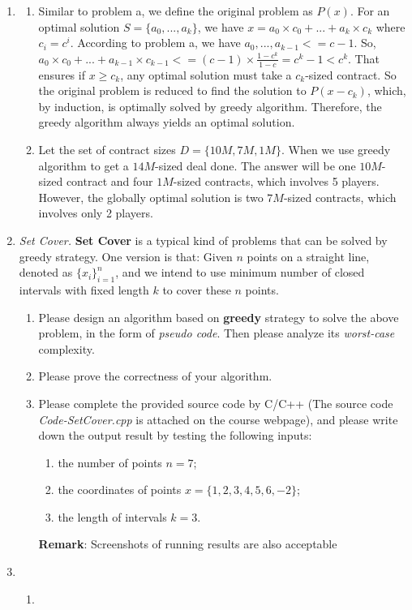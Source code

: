 \documentclass[12pt,a4paper]{article}
\makeatletter
\newtheorem*{solution}{Solution}
\theoremstyle{definition}
\renewenvironment{solution}[1][Solution] {\par\pushQED{\qed}\normalfont\topsep6\p@\@plus6\p@\relax\trivlist\item[\hskip\labelsep\bfseries#1\@addpunct{.}]\ignorespaces}{\popQED\endtrivlist\@endpefalse} \makeatother
\makeatother
\begin{document}
\begin{enumerate}
\begin{solution}
\begin{enumerate}
                \item Similar to problem a, we define the original problem as $P(x)$. 
                For an optimal solution $S=\{a_0,...,a_k\}$, we have $x = a_0\times c_0+...+a_k\times c_k$ where $ c_i = c^{i}$. 
                According to problem a, we have $a_0,...,a_{k-1}<=c-1$. 
                So, $a_0\times c_0+...+a_{k-1}\times c_{k-1}<=(c-1)\times \frac{1-c^{k}}{1-c}=c^{k}-1<c^{k}$.
                That ensures if $x\ge c_k$, any optimal solution must take a $c_k$-sized contract.
                So the original problem is reduced to find the solution to $P(x-c_k)$, which, by induction, is optimally solved by greedy algorithm.
                Therefore, the greedy algorithm always yields an optimal solution.
                
                \item Let the set of contract sizes $D = \{10M,7M,1M\}$. 
                When we use greedy algorithm to get a $14M$-sized deal done.
                The answer will be one $10M$-sized contract and four $1M$-sized contracts, which involves 5 players.
                However, the globally optimal solution is two $7M$-sized contracts, which involves only 2 players.
        \end{enumerate}
    \end{solution}
    
	
    \item \textit{Set Cover.} \textbf{Set Cover} is a typical kind of problems that can be solved by greedy strategy. One version is that: Given $n$ points on a straight line, denoted as $\{x_i\}_{i=1}^n$, and we intend to use minimum number of closed intervals with fixed length $k$ to cover these $n$ points.
    \begin{enumerate}
    	\item Please design an algorithm based on \textbf{greedy} strategy to solve the above problem, in the form of \emph{pseudo code}. Then please analyze its \emph{worst-case} complexity.
    	\item Please prove the correctness of your algorithm.
    	\item Please complete the provided source code by C/C++ {\color{blue}(The source code \emph{Code-SetCover.cpp} is attached on the course webpage)}, and please write down the output result by testing the following inputs: 
    	\begin{enumerate}
    		\item the number of points $n=7$;
    		\item the coordinates of points
    		$x=\{1,2,3,4,5,6,-2\}$;
    		\item the length of intervals
    		$k=3$.
    	\end{enumerate}
        \textbf{Remark}: Screenshots of running results are also acceptable 
    \end{enumerate}
    \begin{solution}
        ~\\
        \begin{enumerate}
        \item 
        

\end{enumerate}
\end{solution}
\end{enumerate}
\end{document}
